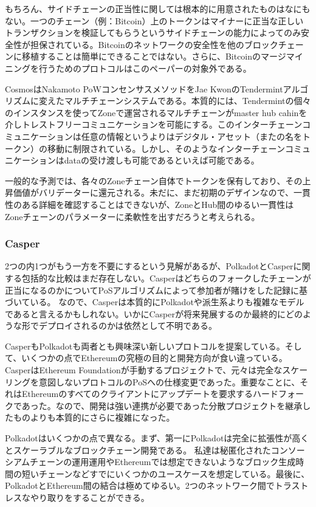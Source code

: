 もちろん、サイドチェーンの正当性に関しては根本的に用意されたものはなにもない。一つのチェーン（例：Bitcoin）上のトークンはマイナーに正当な正しいトランザクションを検証してもらうというサイドチェーンの能力によってのみ安全性が担保されている。Bitcoinのネットワークの安全性を他のブロックチェーンに移植することは簡単にできることではない。さらに、Bitcoinのマージマイニングを行うためのプロトコルはこのペーパーの対象外である。

CosmosはNakamoto PoWコンセンサスメソッドをJae
KwonのTendermintアルゴリズムに変えたマルチチェーンシステムである。本質的には、Tendermintの個々のインスタンスを使ってZoneで運営されるマルチチェーンがmaster
hub
cahinを介しトレストフリーコミュニケーションを可能にする。このインターチェーンコミュニケーションは任意の情報というよりはデジタル・アセット（またの名をトークン）の移動に制限されている。しかし、そのようなインターチェーンコミュニケーションはdataの受け渡しも可能であるといえば可能である。

一般的な予測では、各々のZoneチェーン自体でトークンを保有しており、その上昇価値がバリデーターに還元される。未だに、まだ初期のデザインなので、一貫性のある詳細を確認することはできないが、ZoneとHub間のゆるい一貫性はZoneチェーンのパラメーターに柔軟性を出すだろうと考えられる。

\hypertarget{casper}{%
\subsubsection{Casper}\label{casper}}

2つの内1つがもう一方を不要にするという見解があるが、PolkadotとCasperに関する包括的な比較はまだ存在しない。Casperはどちらのフォークしたチェーンが正当になるのかについてPoSアルゴリズムによって参加者が賭けをした記録に基づいている。
なので、Casperは本質的にPolkadotや派生系よりも複雑なモデルであると言えるかもしれない。いかにCasperが将来発展するのか最終的にどのような形でデプロイされるのかは依然として不明である。

CasperもPolkadotも両者とも興味深い新しいプロトコルを提案している。そして、いくつかの点でEthereumの究極の目的と開発方向が食い違っている。CasperはEthereum
Foundationが手動するプロジェクトで、元々は完全なスケーリングを意図しないプロトコルのPoSへの仕様変更であった。重要なことに、それはEthereumのすべてのクライアントにアップデートを要求するハードフォークであった。なので、開発は強い連携が必要であった分散プロジェクトを継承したものよりも本質的にさらに複雑になった。

Polkadotはいくつかの点で異なる。まず、第一にPolkadotは完全に拡張性が高くとスケーラブルなブロックチェーン開発である。
私達は秘匿化されたコンソーシアムチェーンの運用運用やEthereumでは想定できないようなブロック生成時間の短いチェーンなどすでにいくつかのユースケースを想定している。最後に、PolkadotとEthereum間の結合は極めてゆるい。2つのネットワーク間でトラストレスなやり取りをすることができる。

